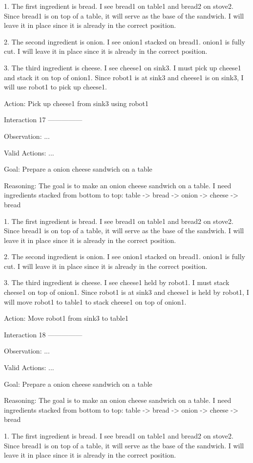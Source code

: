 1. The first ingredient is bread. I see bread1 on table1 and bread2 on stove2. Since bread1 is on top of a table, it will serve as the base of the sandwich. I will leave it in place since it is already in the correct position.

2. The second ingredient is onion. I see onion1 stacked on bread1. onion1 is fully cut. I will leave it in place since it is already in the correct position.

3. The third ingredient is cheese. I see cheese1 on sink3. I must pick up cheese1 and stack it on top of onion1. Since robot1 is at sink3 and cheese1 is on sink3, I will use robot1 to pick up cheese1.

Action: Pick up cheese1 from sink3 using robot1


Interaction 17
---------------


Observation:
...

Valid Actions:
...

Goal: Prepare a onion cheese sandwich on a table


Reasoning: The goal is to make an onion cheese sandwich on a table. I need ingredients stacked from bottom to top: table -> bread -> onion -> cheese -> bread

1. The first ingredient is bread. I see bread1 on table1 and bread2 on stove2. Since bread1 is on top of a table, it will serve as the base of the sandwich. I will leave it in place since it is already in the correct position.

2. The second ingredient is onion. I see onion1 stacked on bread1. onion1 is fully cut. I will leave it in place since it is already in the correct position.

3. The third ingredient is cheese. I see cheese1 held by robot1. I must stack cheese1 on top of onion1. Since robot1 is at sink3 and cheese1 is held by robot1, I will move robot1 to table1 to stack cheese1 on top of onion1.

Action: Move robot1 from sink3 to table1


Interaction 18
---------------


Observation:
...

Valid Actions:
...

Goal: Prepare a onion cheese sandwich on a table


Reasoning: The goal is to make an onion cheese sandwich on a table. I need ingredients stacked from bottom to top: table -> bread -> onion -> cheese -> bread

1. The first ingredient is bread. I see bread1 on table1 and bread2 on stove2. Since bread1 is on top of a table, it will serve as the base of the sandwich. I will leave it in place since it is already in the correct position.

